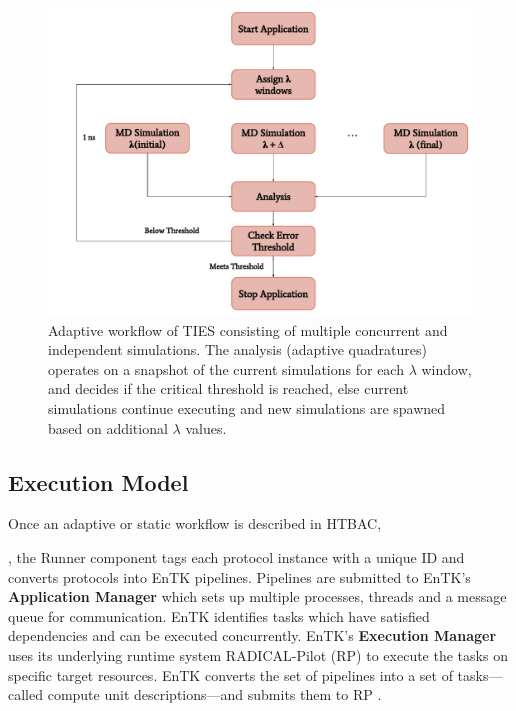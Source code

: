 \begin{figure}
  \centering
  \includegraphics[width=\columnwidth]{figures/adaptive_TIES_workflow_diagram.pdf}
  \caption{Adaptive workflow of TIES consisting of multiple concurrent and
  independent simulations. The analysis (adaptive quadratures) operates on 
  a snapshot of the current simulations for each $\lambda$ window, and decides 
  if the critical threshold is reached, else current simulations continue 
  executing and new simulations are spawned based on additional $\lambda$ 
  values.}
\label{fig:adaptive_ties}
\end{figure}

\subsection{Execution Model}

Once an adaptive or static workflow is described in HTBAC, 

, the Runner component tags each protocol instance with 
a unique ID and converts protocols into EnTK pipelines. 
Pipelines are submitted to EnTK's \textbf{Application Manager} which sets up 
multiple processes, threads and a message queue for communication. EnTK 
identifies tasks which have satisfied dependencies and can be executed 
concurrently. EnTK's \textbf{Execution Manager} uses its underlying runtime 
system RADICAL-Pilot (RP) to execute the tasks on specific target resources. 
EnTK converts the set of pipelines into a set of tasks---called compute unit 
descriptions---and submits them to RP .

